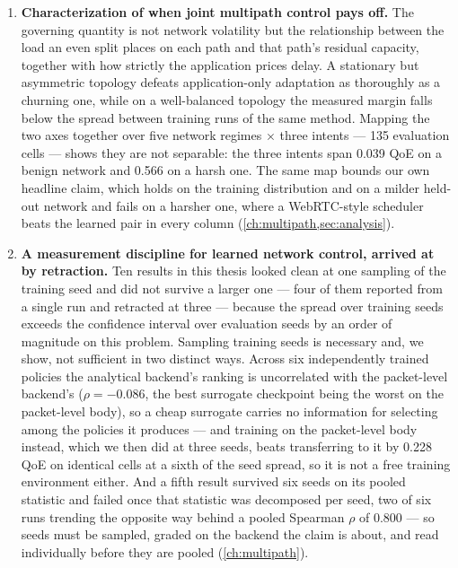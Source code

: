 \begin{enumerate}
  \item \textbf{Characterization of when joint multipath control pays off.} The governing quantity is not
  network volatility but the relationship between the load an even split places on each path and that
  path's residual capacity, together with how strictly the application prices delay. A stationary but
  asymmetric topology defeats application-only adaptation as thoroughly as a churning one, while on a
  well-balanced topology the measured margin falls below the spread between training runs of the same
  method. Mapping the two axes together over five network regimes $\times$ three intents --- 135
  evaluation cells --- shows they are not separable: the three intents span 0.039 QoE on a benign network
  and 0.566 on a harsh one. The same map bounds our own headline claim, which holds on the training
  distribution and on a milder held-out network and fails on a harsher one, where a WebRTC-style
  scheduler beats the learned pair in every column (\cref{ch:multipath,sec:analysis}).

  \item \textbf{A measurement discipline for learned network control, arrived at by retraction.} Ten
  results in this thesis looked clean at one sampling of the training seed and did not survive a larger
  one --- four of them reported from a single run and retracted at three --- because the spread over
  training seeds exceeds the confidence interval over evaluation seeds by
  an order of magnitude on this problem. Sampling training seeds is necessary and, we show, not
  sufficient in two distinct ways. Across six independently trained policies the analytical backend's
  ranking is uncorrelated with the packet-level backend's ($\rho = -0.086$, the best surrogate checkpoint
  being the worst on the packet-level body), so a cheap surrogate carries no information for selecting
  among the policies it produces --- and training on the packet-level body instead, which we then did at
  three seeds, beats transferring to it by 0.228 QoE on identical cells at a sixth of the seed spread, so
  it is not a free training environment either. And a fifth result survived
  six seeds on its pooled statistic and failed once that statistic was decomposed per seed, two of six
  runs trending the opposite way behind a pooled Spearman $\rho$ of 0.800 --- so seeds must be sampled,
  graded on the backend the claim is about, and read individually before they are pooled
  (\cref{ch:multipath}).
\end{enumerate}

